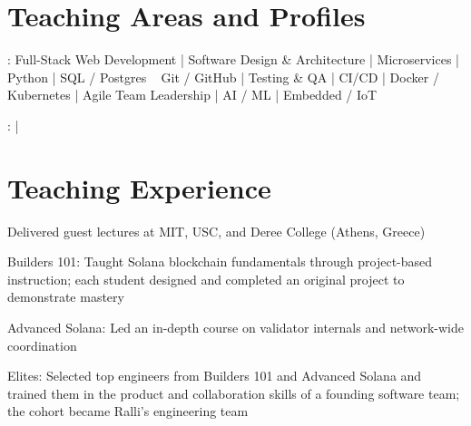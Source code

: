 \documentclass[print]{jack-resume}
\begin{document}
\pagecolor{darkmodeBackground}

%
%



\begin{minipage}[t][1cm][t]{.03\textwidth}
    \hfill
\end{minipage}


\section{Teaching Areas and Profiles}
:
Full-Stack Web Development \hfill | \hfill
Software Design \& Architecture \hfill | \hfill
Microservices \hfill | \hfill
Python \hfill | \hfill
SQL / Postgres \
\hspace{1.0cm} Git / GitHub \hfill | \hfill
Testing \& QA \hfill | \hfill
CI/CD \hfill | \hfill
Docker / Kubernetes \hfill | \hfill
Agile Team Leadership \hfill | \hfill
AI / ML \hfill | \hfill
Embedded / IoT \

\raggedright{
    :
      \href{https://www.linkedin.com/in/jack-sturtevant/}{ \ExternalLink} |
    \custombold{Github} \href{https://github.com/jacksturt}{\custombold{jacksturt} \ExternalLink}}


\section{Teaching Experience}

\begin{tightemize}
    \item Delivered guest lectures at MIT, USC, and Deree College (Athens, Greece)
    \item Builders 101: Taught Solana blockchain fundamentals through project-based instruction; each student designed and completed an original project to demonstrate mastery
    \item Advanced Solana: Led an in-depth course on validator internals and network-wide coordination
    \item Elites: Selected top engineers from Builders 101 and Advanced Solana and trained them in the product and collaboration skills of a founding software team; the cohort became Ralli's engineering team
\end{tightemize}
\sectionsep
\end{document}
